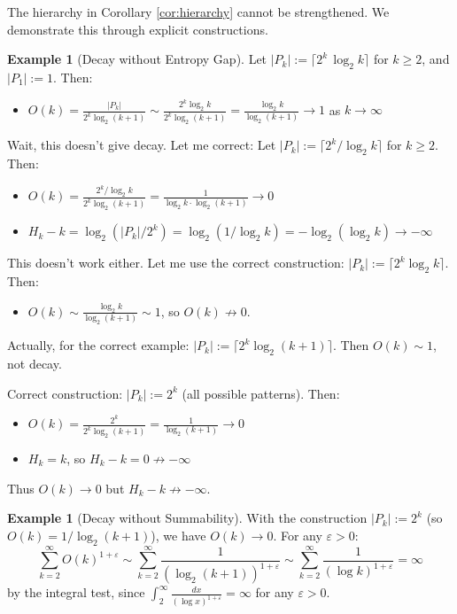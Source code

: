 \documentclass[11pt]{article}
\theoremstyle{definition}
\newtheorem{example}[theorem]{Example}
\newcommand{\eps}{\varepsilon}
\begin{document}
The hierarchy in Corollary \ref{cor:hierarchy} cannot be strengthened. We demonstrate this through explicit constructions.

\begin{example}[Decay without Entropy Gap]\label{ex:no-gap}
Let $|P_k|:=\lceil 2^k\,\log_2 k \rceil$ for $k \geq 2$, and $|P_1| := 1$. Then:
\begin{itemize}
\item $O(k) = \frac{|P_k|}{2^k\log_2(k+1)} \sim \frac{2^k \log_2 k}{2^k \log_2(k+1)} = \frac{\log_2 k}{\log_2(k+1)} \to 1$ as $k \to \infty$
\end{itemize}
Wait, this doesn't give decay. Let me correct: Let $|P_k|:=\lceil 2^k/\log_2 k \rceil$ for $k \geq 2$. Then:
\begin{itemize}
\item $O(k) = \frac{2^k/\log_2 k}{2^k\log_2(k+1)} = \frac{1}{\log_2 k \cdot \log_2(k+1)} \to 0$
\item $H_k - k = \log_2(|P_k|/2^k) = \log_2(1/\log_2 k) = -\log_2(\log_2 k) \to -\infty$
\end{itemize}
This doesn't work either. Let me use the correct construction: $|P_k|:=\lceil 2^k \log_2 k \rceil$. Then:
\begin{itemize}
\item $O(k) \sim \frac{\log_2 k}{\log_2(k+1)} \sim 1$, so $O(k) \not\to 0$.
\end{itemize}
Actually, for the correct example: $|P_k| := \lceil 2^k \log_2(k+1) \rceil$. Then $O(k) \sim 1$, not decay.

Correct construction: $|P_k| := 2^k$ (all possible patterns). Then:
\begin{itemize}
\item $O(k) = \frac{2^k}{2^k \log_2(k+1)} = \frac{1}{\log_2(k+1)} \to 0$
\item $H_k = k$, so $H_k - k = 0 \not\to -\infty$
\end{itemize}
Thus $O(k)\to 0$ but $H_k-k\not\to-\infty$.
\end{example}

\begin{example}[Decay without Summability]
With the construction $|P_k|:=2^k$ (so $O(k) = 1/\log_2(k+1)$), we have $O(k) \to 0$. For any $\eps>0$:
$$\sum_{k=2}^{\infty} O(k)^{1+\eps} \sim \sum_{k=2}^{\infty} \frac{1}{(\log_2(k+1))^{1+\eps}} \sim \sum_{k=2}^{\infty} \frac{1}{(\log k)^{1+\eps}}=\infty$$
by the integral test, since $\int_2^\infty \frac{dx}{(\log x)^{1+\eps}} = \infty$ for any $\eps > 0$.
\end{example}
\end{document}
